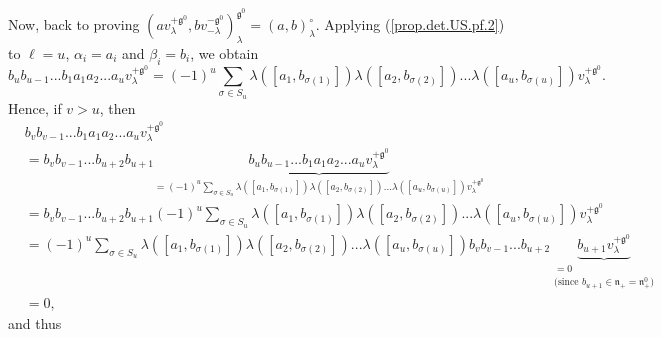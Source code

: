 \documentclass[etingof-lie.tex]{subfiles}
\begin{document}
Now, back to proving $\left(  av_{\lambda}^{+\mathfrak{g}^{0}},bv_{-\lambda
}^{-\mathfrak{g}^{0}}\right)  _{\lambda}^{\mathfrak{g}^{0}}=\left(
a,b\right)  _{\lambda}^{\circ}$. Applying (\ref{prop.det.US.pf.2}) to $\ell
=u$, $\alpha_{i}=a_{i}$ and $\beta_{i}=b_{i}$, we obtain%
\[
b_{u}b_{u-1}...b_{1}a_{1}a_{2}...a_{u}v_{\lambda}^{+\mathfrak{g}^{0}}= \left(
-1\right) ^{u} \sum\limits_{\sigma\in S_{u}}\lambda\left(  \left[
a_{1},b_{\sigma\left(  1\right)  }\right]  \right)  \lambda\left(  \left[
a_{2},b_{\sigma\left(  2\right)  }\right]  \right)  ...\lambda\left(  \left[
a_{u},b_{\sigma\left(  u\right)  }\right]  \right)  v_{\lambda}^{+\mathfrak{g}%
^{0}}.
\]
Hence, if $v>u$, then%
\begin{align*}
&  b_{v}b_{v-1}...b_{1}a_{1}a_{2}...a_{u}v_{\lambda}^{+\mathfrak{g}^{0}}\\
&  =b_{v}b_{v-1}...b_{u+2}b_{u+1}\underbrace{b_{u}b_{u-1}...b_{1}a_{1}%
a_{2}...a_{u}v_{\lambda}^{+\mathfrak{g}^{0}}}_{=\left(  -1\right)  ^{u}%
\sum\limits_{\sigma\in S_{u}}\lambda\left(  \left[  a_{1},b_{\sigma\left(
1\right)  }\right]  \right)  \lambda\left(  \left[  a_{2},b_{\sigma\left(
2\right)  }\right]  \right)  ...\lambda\left(  \left[  a_{u},b_{\sigma\left(
u\right)  }\right]  \right)  v_{\lambda}^{+\mathfrak{g}^{0}}}\\
&  =b_{v}b_{v-1}...b_{u+2}b_{u+1}\left(  -1\right)  ^{u}\sum\limits_{\sigma\in
S_{u}}\lambda\left(  \left[  a_{1},b_{\sigma\left(  1\right)  }\right]
\right)  \lambda\left(  \left[  a_{2},b_{\sigma\left(  2\right)  }\right]
\right)  ...\lambda\left(  \left[  a_{u},b_{\sigma\left(  u\right)  }\right]
\right)  v_{\lambda}^{+\mathfrak{g}^{0}}\\
&  =\left(  -1\right)  ^{u}\sum\limits_{\sigma\in S_{u}}\lambda\left(  \left[
a_{1},b_{\sigma\left(  1\right)  }\right]  \right)  \lambda\left(  \left[
a_{2},b_{\sigma\left(  2\right)  }\right]  \right)  ...\lambda\left(  \left[
a_{u},b_{\sigma\left(  u\right)  }\right]  \right)  b_{v}b_{v-1}%
...b_{u+2}\underbrace{b_{u+1}v_{\lambda}^{+\mathfrak{g}^{0}}}%
_{\substack{=0\\\text{(since }b_{u+1}\in\mathfrak{n}_{+}=\mathfrak{n}_{+}%
^{0}\text{)}}}\\
&  =0,
\end{align*}
and thus%
\end{document}
